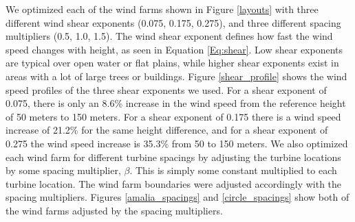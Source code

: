 We optimized each of the wind farms shown in Figure \ref{layouts} with three different wind shear exponents (0.075, 0.175, 0.275), and three different spacing multipliers (0.5, 1.0, 1.5). The wind shear exponent defines how fast the wind speed changes with height, as seen in Equation \ref{Eq:shear}. Low shear exponents are typical over open water or flat plains, while higher shear exponents exist in areas with a lot of large trees or buildings. Figure \ref{shear_profile} shows the wind speed profiles of the three shear exponents we used. For a shear exponent of 0.075, there is only an 8.6\% increase in the wind speed from the reference height of 50 meters to 150 meters. For a shear exponent of 0.175 there is a wind speed increase of 21.2\% for the same height difference, and for a shear exponent of 0.275 the wind speed increase is 35.3\% from 50 to 150 meters. We also optimized each wind farm for different turbine spacings by adjusting the turbine locations by some spacing multiplier, $\beta$.  This is simply some constant multiplied to each turbine location. The wind farm boundaries were adjusted accordingly with the spacing multipliers. Figures \ref{amalia_spacings} and \ref{circle_spacings} show both of the wind farms adjusted by the spacing multipliers.



